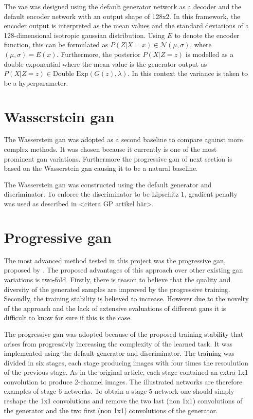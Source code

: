 The \acrlong{vae} was designed using the default generator network as a decoder and the default encoder network with an output shape of 128x2. In this framework, the encoder output is interpreted as the mean values and the standard deviations of a 128-dimensional isotropic gaussian distribution. Using $E$ to denote the encoder function, this can be formulated as $P(Z|X=x) \in \mathcal{N}(\mu, \sigma)$, where $(\mu, \sigma) = E(x)$. Furthermore, the posterior $P(X|Z=z)$ is modelled as a double exponential where the mean value is the generator output as $P(X|Z=z) \in \text{Double Exp}(G(z), \lambda)$. In this context the variance is taken to be a hyperparameter.

\section{Wasserstein \acrshort{gan}}
The Wasserstein \acrshort{gan} was adopted as a second baseline to compare against more complex methods. It was chosen because it currently is one of the most prominent \acrshort{gan} variations. Furthermore the progressive \acrshort{gan} of next section is based on the Wasserstein \acrshort{gan} causing it to be a natural baseline. 

The Wasserstein \acrshort{gan} was constructed using the default generator and discriminator. To enforce the discriminator to be Lipschitz 1, gradient penalty was used as described in <citera GP artikel här>.

\section{Progressive \acrshort{gan}}
The most advanced method tested in this project was the progressive \acrshort{gan}, proposed by \textcite{karras2017progressive}. The proposed advantages of this approach over other existing \acrshort{gan} variations is two-fold. Firstly, there is reason to believe that the quality and diversity of the generated samples are improved by the progressive training. Secondly, the training stability is believed to increase. However due to the novelty of the approach and the lack of extensive evaluations of different \acrshort{gans} it is difficult to know for sure if this is the case.

The progressive \acrshort{gan} was adopted because of the proposed training stability that arises from progressivly increasing the complexity of the learned task. It was implemented using the default generator and discriminator. The training was divided in six stages, each stage producing images with four times the resoulution of the previous stage. As in the original article, each stage contained an extra 1x1 convolution to produce 2-channel images. The illustrated networks are therefore examples of stage-6 networks. To obtain a stage-5 network one should simply reshape the 1x1 convolutions and remove the two last (non 1x1) convolutions of the generator and the two first (non 1x1) convolutions of the generator.


